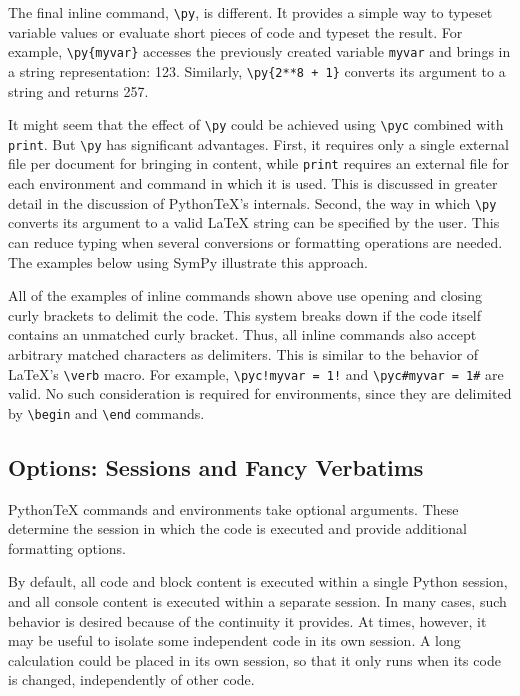 \documentclass[letterpaper,compsoc,twoside]{IEEEtran}
\begin{document}
The final inline command, \texttt{\textbackslash{}py}, is different.  It provides a simple way
to typeset variable values or evaluate short pieces of code and typeset
the result.  For example, \texttt{\textbackslash{}py\{myvar\}} accesses the previously created
variable \texttt{myvar} and brings in a string representation:  123.  Similarly, \texttt{\textbackslash{}py\{2**8 + 1\}} converts its argument to a string and returns
257.

It might seem that the effect of \texttt{\textbackslash{}py} could be achieved using \texttt{\textbackslash{}pyc}
combined with \texttt{print}.  But \texttt{\textbackslash{}py} has significant advantages.  First,
it requires only a single external file per document for bringing in content,
while \texttt{print} requires an external file for each environment and command in
which it is used.  This is discussed in greater detail in the discussion of
PythonTeX's internals.  Second, the way in which \texttt{\textbackslash{}py} converts its argument
to a valid LaTeX string can be specified by the user.  This can reduce typing
when several conversions or formatting operations are needed.  The examples
below using SymPy illustrate this approach.

All of the examples of inline commands shown above use opening and closing
curly brackets to delimit the code.  This system breaks down if the code
itself contains an unmatched curly bracket.  Thus, all inline commands
also accept arbitrary matched characters as delimiters.  This is similar
to the behavior of LaTeX's \texttt{\textbackslash{}verb} macro.  For example,
\texttt{\textbackslash{}pyc!myvar = 1!} and \texttt{\textbackslash{}pyc\#myvar = 1\#} are valid.  No such
consideration is required for environments, since they are delimited
by \texttt{\textbackslash{}begin} and \texttt{\textbackslash{}end} commands.

\subsection{Options:  Sessions and Fancy Verbatims%
  \label{options-sessions-and-fancy-verbatims}%
}


PythonTeX commands and environments take optional arguments.  These
determine the session in which the code is executed and provide
additional formatting options.

By default, all code and block content is executed within a single
Python session, and all console content is executed within a separate
session.  In many cases, such behavior is desired because of the continuity
it provides.  At times, however, it may be useful to isolate some independent
code in its own session.  A long calculation could be placed in
its own session, so that it only runs when its code is changed, independently
of other code.
\end{document}
